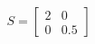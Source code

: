 \documentclass[preview]{standalone}
\begin{document}
\begin{align*}
S = \begin{bmatrix} 2 & 0 \\ 0 & 0.5 \end{bmatrix}
\end{align*}
\end{document}
